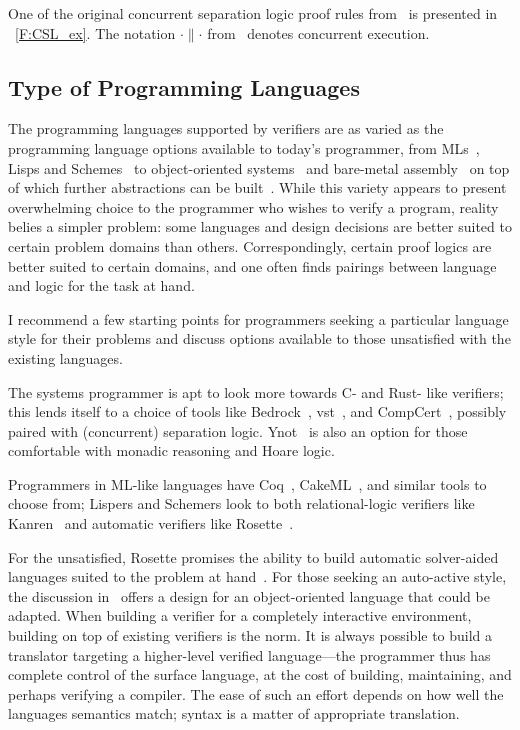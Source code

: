 One of the original concurrent separation logic proof rules
from~\cite{O_Hearn_2007} is presented in \figurename~\ref{F:CSL_ex}. The
notation \(\cdot \parallel \cdot\) from~\cite{O_Hearn_2007} denotes concurrent
execution.

\subsection{Type of Programming Languages}\label{S:t_pl}

The programming languages supported by verifiers are as varied as the
programming language options available to today's programmer, from
MLs~\cite{Coq,Kumar_2014}, Lisps and Schemes~\cite{Torlak_2013} to
object-oriented systems~\cite{leino2008specification,leino2010dafny} and
bare-metal assembly~\cite{Chlipala_2011} on top of which further abstractions
can be built~\cite{Chlipala_2015}. While this variety appears to present
overwhelming choice to the programmer who wishes to verify a program, reality
belies a simpler problem: some languages and design decisions are better suited
to certain problem domains than others. Correspondingly, certain proof logics
are better suited to certain domains, and one often finds pairings between
language and logic for the task at hand.

I recommend a few starting points for programmers seeking a particular language
style for their problems and discuss options available to those unsatisfied with
the existing languages.

The systems programmer is apt to look more towards C- and Rust- like verifiers; this
lends itself to a choice of tools like Bedrock~\cite{Chlipala_2011},
\gls{vst}~\cite{VST}, and CompCert~\cite{Kastner-LBSSF-2017}, possibly paired
with (concurrent) separation logic. Ynot~\cite{Nanevski08ynot:reasoning} is also
an option for those comfortable with monadic reasoning and Hoare logic.

Programmers in ML-like languages have Coq~\cite{Coq}, CakeML~\cite{Kumar_2014},
and similar tools to choose from; Lispers and Schemers look to both
relational-logic verifiers like Kanren~\cite{Byrd_2009} and automatic verifiers
like Rosette~\cite{Rosette}.

For the unsatisfied, Rosette promises the ability to build automatic
solver-aided languages suited to the problem at hand~\cite{Torlak_2013}. For
those seeking an auto-active style, the discussion
in~\cite{leino2008specification,Ahmadi_2014} offers a design for an
object-oriented language that could be adapted. When building a verifier for a
completely interactive environment, building on top of existing verifiers is the
norm. It is always possible to build a translator targeting a higher-level
verified language---the programmer thus has complete control of the surface
language, at the cost of building, maintaining, and perhaps verifying a
compiler. The ease of such an effort depends on how well the languages semantics
match; syntax is a matter of appropriate translation.
